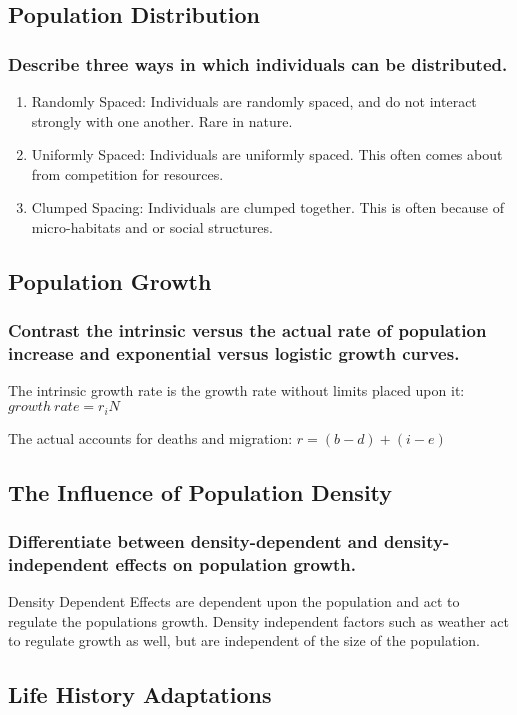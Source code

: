 \documentclass[a4paper]{article}
\begin{document}
\subsection{Population Distribution}
\subsubsection{Describe three ways in which individuals can be distributed.}
\begin{enumerate}
  \item Randomly Spaced: Individuals are randomly spaced, and do not interact strongly with one another. Rare in nature.
  \item Uniformly Spaced: Individuals are uniformly spaced. This often comes about from competition for resources.
  \item Clumped Spacing: Individuals are clumped together. This is often because of micro-habitats and or social structures.
\end{enumerate}

\subsection{Population Growth}
\subsubsection{Contrast the intrinsic versus the actual rate of population increase and exponential versus logistic growth curves.}
The intrinsic growth rate is the growth rate without limits placed upon it: $growth\ rate=r_iN$

The actual accounts for deaths and migration: $r=(b-d)+(i-e)$

\subsection{The Influence of Population Density}
\subsubsection{Differentiate between density-dependent and density-independent effects on population growth.}
Density Dependent Effects are dependent upon the population and act to regulate the populations growth. Density
independent factors such as weather act to regulate growth as well, but are independent of the size of the population.

\subsection{Life History Adaptations}
\end{document}
